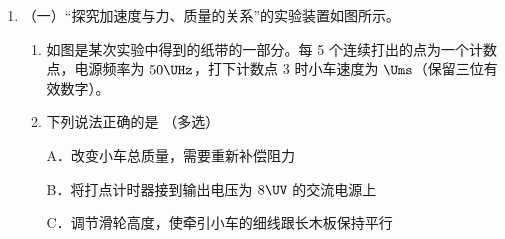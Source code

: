 \documentclass[\gkver]{gaokaozhenti}
\begin{document}
\begin{enumerate}
{设圆环 I 中电流的有效值为 $I$，根据有效值定义可得 $I^{2}R \cdot 3t_{0} = I_{1}^{2}R \cdot 2t_{0} + I_{2}^{2}Rt_{0}$

联立解得 $I = \frac{\sqrt{2}\pi r^{2}B_{0}}{Rt_{0}}$

故 A 错误；

B．设右侧有一无限长的直导线 $C'D'$ 与 CD 构成回路，则 $t = 1.5t_{0}$ 时刻，CD、$C'D'$ 回路产生的总电动势为 $E_{\text{总}} = \pi r^{2} \cdot \frac{2B_{0}}{t_{0}}$

根据对称性可知 $t = 1.5t_{0}$ 时刻直导线 CD 电动势为 $\pi r^{2}\frac{B_{0}}{t_{0}}$，故 B 正确；

C．由于圆环 Ⅱ 处于磁场外部，通过圆环 Ⅱ 的磁通量一直为 0，所以圆环 Ⅱ 不会产生感应电流，则 $t = 0.5t_{0}$ 时刻圆环 Ⅱ 中电流为 0，故 C 错误；

D．以 O 点为圆心，过程 P、Q 两点圆轨道，在 $t = 0.5t_{0}$ 时刻产生的电动势为 $E = \pi r^{2}\frac{B_{0}}{t_{0}}$

则 P、Q 两点间圆弧的电动势为 $E' = \frac{30^{\circ}}{360^{\circ}}E = \frac{1}{12}\pi r^{2}\frac{B_{0}}{t_{0}}$

由于 P、Q 两点间圆弧与圆环 Ⅱ 上 PQ 构成回路不会产生感应电流，则圆环 Ⅱ 上 PQ 间电动势为 $\frac{1}{12}\pi r^{2}\frac{B_{0}}{t_{0}}$，故 D 正确。

故选 BD。
}

\item
（一）“探究加速度与力、质量的关系”的实验装置如图所示。


\begin{enumerate}
\item
如图是某次实验中得到的纸带的一部分。每 5 个连续打出的点为一个计数点，电源频率为 $50 \UHz$，打下计数点 3 时小车速度为  $\Ums$（保留三位有效数字）。


\item
下列说法正确的是 （多选）

A．改变小车总质量，需要重新补偿阻力

B．将打点计时器接到输出电压为 $8 \UV$ 的交流电源上

C．调节滑轮高度，使牵引小车的细线跟长木板保持平行


\end{enumerate}
\end{enumerate}
\end{document}
